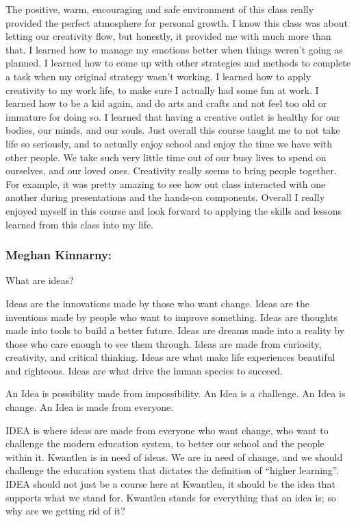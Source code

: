 \documentclass[letterpaper,10pt,headsepline]{scrreprt}
\begin{document}
The positive, warm, encouraging and safe environment of this class really provided the perfect atmosphere for personal growth. I know this class was about letting our creativity flow, but honestly, it provided me with much more than that. I learned how to manage my emotions better when things weren’t going as planned. I learned how to come up with other strategies and methods to complete a task when my original strategy wasn’t working. I learned how to apply creativity to my work life, to make sure I actually had some fun at work. I learned how to be a kid again, and do arts and crafts and not feel too old or immature for doing so. I learned that having a creative outlet is healthy for our bodies, our minds, and our souls. Just overall this course taught me to not take life so seriously, and to actually enjoy school and enjoy the time we have with other people. We take such very little time out of our busy lives to spend on ourselves, and our loved ones. Creativity really seems to bring people together. For example, it was pretty amazing to see how out class interacted with one another during presentations and the hands-on components. Overall I really enjoyed myself in this course and look forward to applying the skills and lessons learned from this class into my life. 

\subsubsection{Meghan Kinnarny:}

What are ideas?

Ideas are the innovations made by those who want change. Ideas are the inventions made by people who want to improve something. Ideas are thoughts made into tools to build a better future. Ideas are dreams made into a reality by those who care enough to see them through. Ideas are made from curiosity, creativity, and critical thinking. Ideas are what make life experiences beautiful and righteous. Ideas are what drive the human species to succeed.

An Idea is possibility made from impossibility. An Idea is a challenge. An Idea is change. An Idea is made from everyone. 

IDEA is where ideas are made from everyone who want change, who want to challenge the modern education system, to better our school and the people within it. Kwantlen is in need of ideas. We are in need of change, and we should challenge the education system that dictates the definition of “higher learning”. IDEA should not just be a course here at Kwantlen, it should be the idea that supports what we stand for. Kwantlen stands for everything that an idea is; so why are we getting rid of it? 
\end{document}
